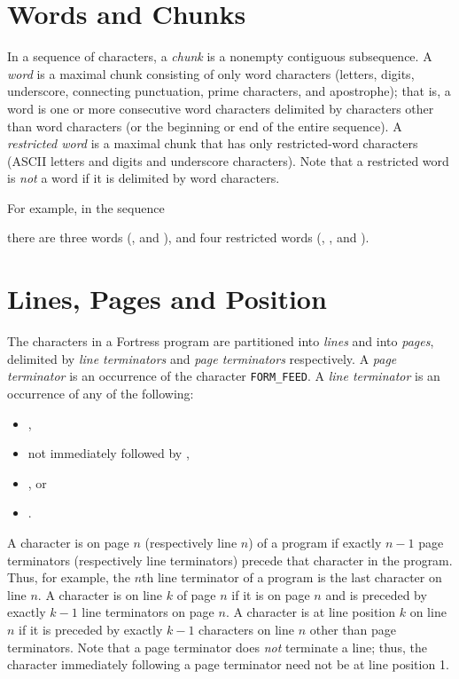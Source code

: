 \section{Words and Chunks}

In a sequence of characters,
a \emph{chunk} is a nonempty contiguous subsequence.
A \emph{word} is a maximal chunk consisting of only word characters
(letters, digits, underscore,
connecting punctuation,
prime characters, and apostrophe);
that is, a word is one or more consecutive word characters
delimited by characters other than word characters
(or the beginning or end of the entire sequence).
A \emph{restricted word} is
a maximal chunk that has only restricted-word characters
(ASCII letters and digits and underscore characters).
Note that a restricted word is \emph{not} a word
if it is delimited by word characters.

For example, in the sequence

there are three words (,  and ),
and four restricted words (, ,  and ).


\section{Lines, Pages and Position}

The characters in a Fortress program
are partitioned into \emph{lines} and into \emph{pages},
delimited by \emph{line terminators} and \emph{page terminators}
respectively.
A \emph{page terminator}
is an occurrence of the character \verb$FORM_FEED$.
A \emph{line terminator} is an occurrence of any of the following:
\begin{itemize}

\item
{},

\item
{} not immediately followed by ,

\item
{}, or

\item
{}.

\end{itemize}

A character is on page $n$
(respectively line $n$) of a program
if exactly $n-1$ page terminators (respectively line terminators)
precede that character in the program.
Thus, for example,
the $n$th line terminator of a program
is the last character on line $n$.
A character is on line $k$ of page $n$
if it is on page $n$
and is preceded by exactly $k-1$ line terminators on page $n$.
A character is at line position $k$ on line $n$
if it is preceded by exactly $k-1$ characters on line $n$
other than page terminators.
Note that a page terminator does \emph{not} terminate a line;
thus, the character immediately following a page terminator
need not be at line position 1.

